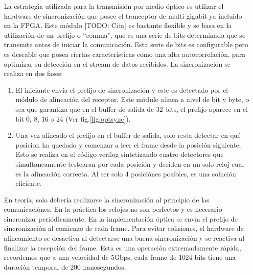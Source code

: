 La estrategia utilizada para la transmisión por medio óptico es utilizar el hardware de sincronización que posee el tranceptor de multi-gigabit ya incluido en la FPGA. Este módulo [TODO: Cita] es bastante flexible y se basa en la utilización de un prefijo o ``comma'', que es una serie de bits determinada que se transmite antes de iniciar la comunicación. Esta serie de bits es configurable pero es deseable que posea ciertas características como una alta autocorrelación, para optimizar su detección en el stream de datos recibidos.
La sincronización se realiza en dos fases:
\begin{enumerate}
 \item El iniciante envía el prefijo de sincronización y este es detectado por el módulo de alineación del receptor. Este módulo alinea a nivel de bit y byte, o sea que garantiza que en el buffer de salida de 32 bits, el prefijo aparece en el bit 0, 8, 16 o 24 (Ver fig.\ref{fig:optsync}).
 \item Una vez alineado el prefijo en el buffer de salida, solo resta detectar en qué posicion ha quedado y comenzar a leer el frame desde la posición siguiente. Esto se realiza en el código verilog sintetizando cuatro detectores que simultaneamente testearan por cada posición y deciden en un solo reloj cual es la alineación correcta. Al ser solo 4 posiciónes posibles, es una solución eficiente.
\end{enumerate}

En teoría, solo debería realizarse la sincronización al principio de las comunicaciónes. En la práctica los relojes no son perfectos y es necesario sincronizar periódicamente. En la implementación óptica se envía el prefijo de sincronización al comienzo de cada frame.
Para evitar colisiones, el hardware de alineamiento se desactiva al detectarse una buena sincronización y se reactiva al finalizar la recepción del frame. Esta es una operación extremadamente rápida, recordemos que a una velocidad de 5Gbps, cada frame de 1024 bits tiene una duración temporal de 200 nanosegundos.

